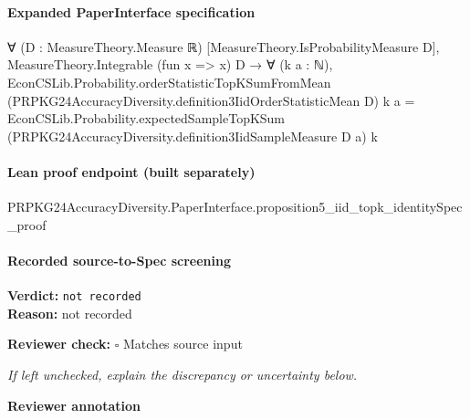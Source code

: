 \documentclass[10pt]{article}
\newcommand{\reviewerbox}{%
  \par\noindent\fbox{\parbox{0.96\linewidth}{\rule{0pt}{0.38in}}}\par
}
\newcommand{\reviewmatch}[1]{%
  \par\noindent\textbf{Reviewer check:} $\square$\; #1\par
  \noindent\emph{If left unchecked, explain the discrepancy or uncertainty below.}\par
}
\begin{document}
\paragraph{Expanded PaperInterface specification}
\begin{ReviewVerbatim}
∀ (D : MeasureTheory.Measure ℝ) [MeasureTheory.IsProbabilityMeasure D],
  MeasureTheory.Integrable (fun x => x) D →
    ∀ (k a : ℕ),
      EconCSLib.Probability.orderStatisticTopKSumFromMean (PRPKG24AccuracyDiversity.definition3IidOrderStatisticMean D)
          k a =
        EconCSLib.Probability.expectedSampleTopKSum (PRPKG24AccuracyDiversity.definition3IidSampleMeasure D a) k
\end{ReviewVerbatim}

\paragraph{Lean proof endpoint (built separately)}\begin{ReviewVerbatim}
PRPKG24AccuracyDiversity.PaperInterface.proposition5_iid_topk_identitySpec_proof
\end{ReviewVerbatim}

\paragraph{Recorded source-to-Spec screening}
\textbf{Verdict:} \texttt{not recorded}
\\
\textbf{Reason:} not recorded
\reviewmatch{Matches source input}
\noindent\textbf{Reviewer annotation}\par
\reviewerbox
\end{document}
